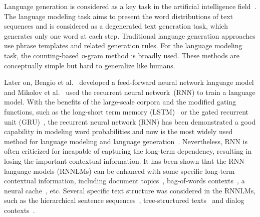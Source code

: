 \documentclass[a4paper]{article}
\begin{document}
Language generation is considered as a key task in the artificial intelligence field~\cite{reiter2000building}.
The language modeling task aims to present the word distributions of text sequences and is considered as a degenerated text generation task, which generates only one word at each step.
Traditional language generation approaches use phrase templates and related generation rules. For the language modeling task, the counting-based \emph{n}-gram method is broadly used. These methods are conceptually simple but hard to generalize like humans.

Later on, Bengio et al.~ developed a feed-forward neural network language model and Mikolov et al.~\cite{mikolov2010recurrent} used the recurrent neural network~(RNN) to train a language model.
With the benefits of the large-scale corpora and the modified gating functions, such as the long-short term memory (LSTM)~\cite{hochreiter1997long} or the gated recurrent unit (GRU)~\cite{chung2014empirical}, the recurrent neural network (RNN) has been demonstrated a good capability in modeling word probabilities and now is the most widely used method for language modeling and language generation~\cite{mikolov2010recurrent,graves2013generating}.
Nevertheless, RNN is often criticized for incapable of capturing the long-term dependency, resulting in losing the important contextual information.
It has been shown that the RNN language models (RNNLMs) can be enhanced with some specific long-term contextual information, including document topics~\cite{mikolov2012context,ghosh2016contextual,dieng2017topicrnn}, bag-of-words contexts~\cite{wang2016larger-context}, a neural cache~\cite{grave2017imroving}, etc.
Several specific text structure was considered in the RNNLMs, such as the hierarchical sentence sequences~\cite{lin2015hierarchical}, tree-structured texts~\cite{tran2016inter} and dialog contexts~\cite{liu2017dialog,mei2017coherent}.
\end{document}
